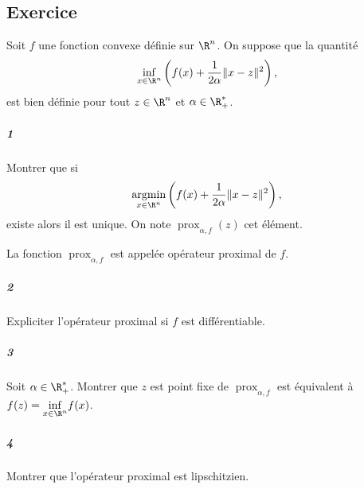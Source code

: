 \documentclass[10pt,a4paper]{article} 
\begin{document}
\subsection{Exercice}
Soit $f$ une fonction convexe définie sur $\R^n$.
On suppose que la quantité
\[ \underset{x \in \R^n}{\inf}\left(f(x) +  \frac{1}{2\alpha} \| x - z \|^2 \right) ,\]
est bien définie pour tout $z \in \R^n$ et $\alpha \in \R_+^*$.
\subparagraph{1} Montrer que si
\[\underset{x \in \R^n}{\operatorname{argmin}}\left(f(x) +  \frac{1}{2\alpha} \| x - z \|^2 \right),\] existe alors il est unique. On note $\operatorname{prox}_{\alpha,f}(z)$ cet élément.

La fonction $\operatorname{prox}_{\alpha,f}$ est appelée opérateur proximal de $f$.
\subparagraph{2} Expliciter l'opérateur proximal si $f$ est différentiable.
\subparagraph{3} Soit $\alpha \in \R_+^*$. Montrer que $z$ est point fixe de $\operatorname{prox}_{\alpha,f}$ est équivalent à $f(z) = \underset{x \in \R^n}{\inf}f(x)$.
\subparagraph{4} Montrer que l'opérateur proximal est lipschitzien.
\end{document}
